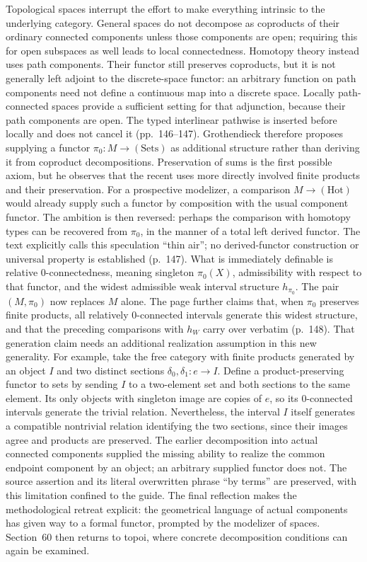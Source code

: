\documentclass[10pt,oneside]{book}
\begin{document}
Topological spaces interrupt the effort to make everything intrinsic to the underlying category. General spaces do not decompose as coproducts of their ordinary connected components unless those components are open; requiring this for open subspaces as well leads to local connectedness. Homotopy theory instead uses path components. Their functor still preserves coproducts, but it is not generally left adjoint to the discrete-space functor: an arbitrary function on path components need not define a continuous map into a discrete space. Locally path-connected spaces provide a sufficient setting for that adjunction, because their path components are open. The typed interlinear pathwise is inserted before locally and does not cancel it (pp.~146--147). Grothendieck therefore proposes supplying a functor $\pi_0:M\to(\mathrm{Sets})$ as additional structure rather than deriving it from coproduct decompositions. Preservation of sums is the first possible axiom, but he observes that the recent uses more directly involved finite products and their preservation. For a prospective modelizer, a comparison $M\to(\mathrm{Hot})$ would already supply such a functor by composition with the usual component functor. The ambition is then reversed: perhaps the comparison with homotopy types can be recovered from $\pi_0$, in the manner of a total left derived functor. The text explicitly calls this speculation ``thin air''; no derived-functor construction or universal property is established (p.~147). What is immediately definable is relative $0$-connectedness, meaning singleton $\pi_0(X)$, admissibility with respect to that functor, and the widest admissible weak interval structure $h_{\pi_0}$. The pair $(M,\pi_0)$ now replaces $M$ alone. The page further claims that, when $\pi_0$ preserves finite products, all relatively $0$-connected intervals generate this widest structure, and that the preceding comparisons with $h_W$ carry over verbatim (p.~148). That generation claim needs an additional realization assumption in this new generality. For example, take the free category with finite products generated by an object $I$ and two distinct sections $\delta_0,\delta_1:e\to I$. Define a product-preserving functor to sets by sending $I$ to a two-element set and both sections to the same element. Its only objects with singleton image are copies of $e$, so its $0$-connected intervals generate the trivial relation. Nevertheless, the interval $I$ itself generates a compatible nontrivial relation identifying the two sections, since their images agree and products are preserved. The earlier decomposition into actual connected components supplied the missing ability to realize the common endpoint component by an object; an arbitrary supplied functor does not. The source assertion and its literal overwritten phrase ``by terms'' are preserved, with this limitation confined to the guide. The final reflection makes the methodological retreat explicit: the geometrical language of actual components has given way to a formal functor, prompted by the modelizer of spaces. Section~60 then returns to topoi, where concrete decomposition conditions can again be examined.
\end{document}
